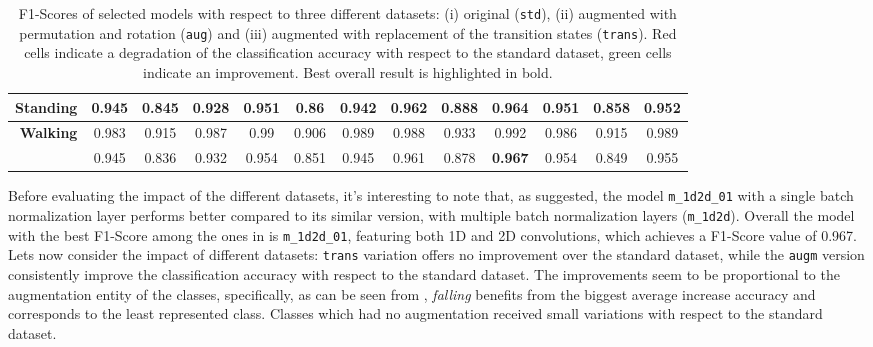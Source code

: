 \begin{table}[!htbp]
{\begin{tabular}{|r|c|c|c|c|c|c|c|c|c|c|c|c|}
\textbf{Standing} & 0.945 & \cellcolor[HTML]{FFCE93}0.845 & \cellcolor[HTML]{FFCE93}0.928 & 0.951 & \cellcolor[HTML]{FFCE93}0.86 & \cellcolor[HTML]{FFCE93}0.942 & 0.962 & \cellcolor[HTML]{FFCE93}0.888 & \cellcolor[HTML]{9AFF99}0.964 & 0.951 & \cellcolor[HTML]{FFCE93}0.858 & \cellcolor[HTML]{9AFF99}0.952 \\ \hline
\textbf{Walking} & 0.983 & \cellcolor[HTML]{FFCE93}0.915 & \cellcolor[HTML]{9AFF99}0.987 & 0.99 & \cellcolor[HTML]{FFCE93}0.906 & \cellcolor[HTML]{FFCE93}0.989 & 0.988 & \cellcolor[HTML]{FFCE93}0.933 & \cellcolor[HTML]{9AFF99}0.992 & 0.986 & \cellcolor[HTML]{FFCE93}0.915 & \cellcolor[HTML]{9AFF99}0.989 \\ \hline
\textbf{} & 0.945 & 0.836 & 0.932 & 0.954 & 0.851 & 0.945 & 0.961 & 0.878 & \textbf{0.967} & 0.954 & 0.849 & 0.955 \\ \hline
\end{tabular}%
}
\caption{F1-Scores of selected models with respect to three different datasets: (i) original (\texttt{std}), (ii) augmented with permutation and rotation (\texttt{aug}) and (iii) augmented with replacement of the transition states (\texttt{trans}). Red cells indicate a degradation of the classification accuracy with respect to the standard dataset, green cells indicate an improvement. Best overall result is highlighted in bold.}
\label{datasets_table}
\end{table}

Before evaluating the impact of the different datasets, it's interesting to note that, as \cite{sensors-2018} suggested, the model \texttt{m_1d2d_01} with a single batch normalization layer performs better compared to its similar version, with multiple batch normalization layers (\texttt{m_1d2d}). Overall the model with the best \mbox{F1-Score} among the ones in  is \texttt{m_1d2d_01}, featuring both 1D and 2D convolutions, which achieves a \mbox{F1-Score} value of 0.967. Lets now consider the impact of different datasets: \texttt{trans} variation offers no improvement over the standard dataset, while the \texttt{augm} version consistently improve the classification accuracy with respect to the standard dataset. The improvements seem to be proportional to the augmentation entity of the classes, specifically, as can be seen from , {\it falling} benefits from the biggest average increase accuracy and corresponds to the least represented class. Classes which had no augmentation received small variations with respect to the standard dataset.


